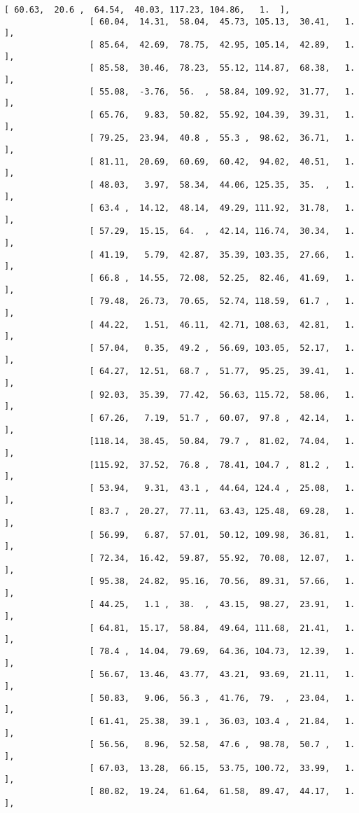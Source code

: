 \documentclass[11pt]{article}
\begin{document}
\begin{Verbatim}[commandchars=\\\{\}]
                 [ 60.63,  20.6 ,  64.54,  40.03, 117.23, 104.86,   1.  ],
                 [ 60.04,  14.31,  58.04,  45.73, 105.13,  30.41,   1.  ],
                 [ 85.64,  42.69,  78.75,  42.95, 105.14,  42.89,   1.  ],
                 [ 85.58,  30.46,  78.23,  55.12, 114.87,  68.38,   1.  ],
                 [ 55.08,  -3.76,  56.  ,  58.84, 109.92,  31.77,   1.  ],
                 [ 65.76,   9.83,  50.82,  55.92, 104.39,  39.31,   1.  ],
                 [ 79.25,  23.94,  40.8 ,  55.3 ,  98.62,  36.71,   1.  ],
                 [ 81.11,  20.69,  60.69,  60.42,  94.02,  40.51,   1.  ],
                 [ 48.03,   3.97,  58.34,  44.06, 125.35,  35.  ,   1.  ],
                 [ 63.4 ,  14.12,  48.14,  49.29, 111.92,  31.78,   1.  ],
                 [ 57.29,  15.15,  64.  ,  42.14, 116.74,  30.34,   1.  ],
                 [ 41.19,   5.79,  42.87,  35.39, 103.35,  27.66,   1.  ],
                 [ 66.8 ,  14.55,  72.08,  52.25,  82.46,  41.69,   1.  ],
                 [ 79.48,  26.73,  70.65,  52.74, 118.59,  61.7 ,   1.  ],
                 [ 44.22,   1.51,  46.11,  42.71, 108.63,  42.81,   1.  ],
                 [ 57.04,   0.35,  49.2 ,  56.69, 103.05,  52.17,   1.  ],
                 [ 64.27,  12.51,  68.7 ,  51.77,  95.25,  39.41,   1.  ],
                 [ 92.03,  35.39,  77.42,  56.63, 115.72,  58.06,   1.  ],
                 [ 67.26,   7.19,  51.7 ,  60.07,  97.8 ,  42.14,   1.  ],
                 [118.14,  38.45,  50.84,  79.7 ,  81.02,  74.04,   1.  ],
                 [115.92,  37.52,  76.8 ,  78.41, 104.7 ,  81.2 ,   1.  ],
                 [ 53.94,   9.31,  43.1 ,  44.64, 124.4 ,  25.08,   1.  ],
                 [ 83.7 ,  20.27,  77.11,  63.43, 125.48,  69.28,   1.  ],
                 [ 56.99,   6.87,  57.01,  50.12, 109.98,  36.81,   1.  ],
                 [ 72.34,  16.42,  59.87,  55.92,  70.08,  12.07,   1.  ],
                 [ 95.38,  24.82,  95.16,  70.56,  89.31,  57.66,   1.  ],
                 [ 44.25,   1.1 ,  38.  ,  43.15,  98.27,  23.91,   1.  ],
                 [ 64.81,  15.17,  58.84,  49.64, 111.68,  21.41,   1.  ],
                 [ 78.4 ,  14.04,  79.69,  64.36, 104.73,  12.39,   1.  ],
                 [ 56.67,  13.46,  43.77,  43.21,  93.69,  21.11,   1.  ],
                 [ 50.83,   9.06,  56.3 ,  41.76,  79.  ,  23.04,   1.  ],
                 [ 61.41,  25.38,  39.1 ,  36.03, 103.4 ,  21.84,   1.  ],
                 [ 56.56,   8.96,  52.58,  47.6 ,  98.78,  50.7 ,   1.  ],
                 [ 67.03,  13.28,  66.15,  53.75, 100.72,  33.99,   1.  ],
                 [ 80.82,  19.24,  61.64,  61.58,  89.47,  44.17,   1.  ],

\end{Verbatim}
\end{document}

